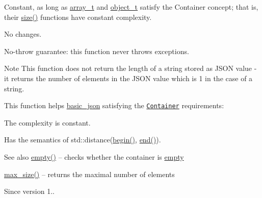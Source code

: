 Constant, as long as \mbox{\hyperlink{classnlohmann_1_1basic__json_ae095578e03df97c5b3991787f1056374}{array\+\_\+t}} and \mbox{\hyperlink{classnlohmann_1_1basic__json_aa1eb13d5aa86f80cbee6c58e90fbaf49}{object\+\_\+t}} satisfy the Container concept; that is, their \mbox{\hyperlink{classnlohmann_1_1basic__json_a25e27ad0c6d53c01871c5485e1f75b96}{size()}} functions have constant complexity.

No changes.

No-\/throw guarantee\+: this function never throws exceptions.

\begin{DoxyNote}{Note}
This function does not return the length of a string stored as J\+S\+ON value -\/ it returns the number of elements in the J\+S\+ON value which is 1 in the case of a string.
\end{DoxyNote}
This function helps {\ttfamily \mbox{\hyperlink{classnlohmann_1_1basic__json}{basic\+\_\+json}}} satisfying the \href{http://en.cppreference.com/w/cpp/concept/Container}{\tt Container} requirements\+:
\begin{DoxyItemize}
\item The complexity is constant.
\item Has the semantics of {\ttfamily std\+::distance(\mbox{\hyperlink{classnlohmann_1_1basic__json_a0ff28dac23f2bdecee9564d07f51dcdc}{begin()}}, \mbox{\hyperlink{classnlohmann_1_1basic__json_a13e032a02a7fd8a93fdddc2fcbc4763c}{end()}})}.
\end{DoxyItemize}

\begin{DoxySeeAlso}{See also}
\mbox{\hyperlink{classnlohmann_1_1basic__json_a1a86d444bfeaa9518d2421aedd74444a}{empty()}} -- checks whether the container is \mbox{\hyperlink{classnlohmann_1_1basic__json_a1a86d444bfeaa9518d2421aedd74444a}{empty}} 

\mbox{\hyperlink{classnlohmann_1_1basic__json_a2f47d3c6a441c57dd2be00449fbb88e1}{max\+\_\+size()}} -- returns the maximal number of elements
\end{DoxySeeAlso}
\begin{DoxySince}{Since}
version 1.. 
\end{DoxySince}
\mbox{\label{classnlohmann_1_1basic__json_a8c9d932353e1ab98a7dc2fc27e002031}} 
